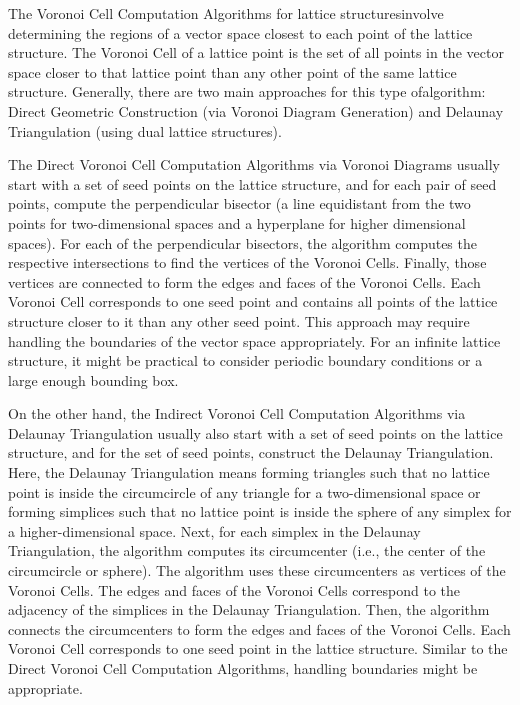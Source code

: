 \documentclass[runningheads]{llncs}
\numberwithin{equation}{section}
\begin{document}
\begin{enumerate}
        The Voronoi Cell Computation Algorithms \cite{sommer-feder-shalvi:finding-closest-lattice-point-interactive-slicing:2009:06-2024,micciancio-voulgaris:deterministic-single-exponential-time-algorithm-most-lattice-problems-based-voronoi-cell-computations:2013:06-2024,mckilliam-grant-clarkson:finding-closest-point-lattice-voronoi-first-kind:2014:06-2024,dadush-bonifas:short-paths-voronoi-graph-and-closest-vector-problem-with-preprocessing:2015:06-2024} for lattice structures\break involve determining the regions of a vector space closest to each point of the lattice structure. The Voronoi Cell of a lattice point is the set of all points in the vector space closer to that lattice point than any other point of the same lattice structure. Generally, there are two main approaches for this type of\break algorithm: Direct Geometric Construction (via Voronoi Diagram Generation\break \cite{voronoi:nouvelles-applications-parametres-continus-theorie-formes-quadratiques:1908:06-2024}) and Delaunay Triangulation \cite{delaunay:sur-la-sphere-vide:1934:06-2024} (using dual lattice structures).

        The Direct Voronoi Cell Computation Algorithms via Voronoi Diagrams usually start with a set of seed points on the lattice structure, and for each pair of seed points, compute the perpendicular bisector (a line equidistant from the two points for two-dimensional spaces and a hyperplane for higher dimensional spaces). For each of the perpendicular bisectors, the algorithm computes the respective intersections to find the vertices of the Voronoi Cells. Finally, those vertices are connected to form the edges and faces of the Voronoi Cells. Each Voronoi Cell corresponds to one seed point and contains all points of the lattice structure closer to it than any other seed point. This approach may require handling the boundaries of the vector space appropriately. For an infinite lattice structure, it might be practical to consider periodic boundary conditions or a large enough bounding box.

        On the other hand, the Indirect Voronoi Cell Computation Algorithms via Delaunay Triangulation usually also start with a set of seed points on the lattice structure, and for the set of seed points, construct the Delaunay Triangulation. Here, the Delaunay Triangulation means forming triangles such that no lattice point is inside the circumcircle of any triangle for a two-dimensional space or forming simplices such that no lattice point is inside the sphere of any simplex for a higher-dimensional space. Next, for each simplex in the Delaunay Triangulation, the algorithm computes its circumcenter (i.e., the center of the circumcircle or sphere). The algorithm uses these circumcenters as vertices of the Voronoi Cells. The edges and faces of the Voronoi Cells correspond to the adjacency of the simplices in the Delaunay Triangulation. Then, the algorithm connects the circumcenters to form the edges and faces of the Voronoi Cells. Each Voronoi Cell corresponds to one seed point in the lattice structure. Similar to the Direct Voronoi Cell Computation Algorithms, handling boundaries might be appropriate.


\end{enumerate}
\end{document}
